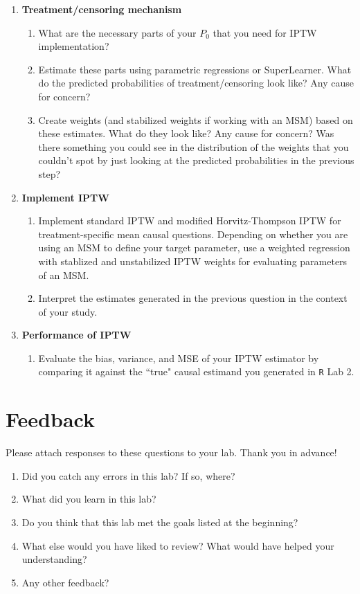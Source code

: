 \documentclass{exam}
\begin{document}
\begin{enumerate}
\item \textbf{Treatment/censoring mechanism}
\begin{enumerate}
\item What are the necessary parts of your $P_0$ that you need for IPTW implementation?
\item Estimate these parts using parametric regressions or SuperLearner. What do the predicted probabilities of treatment/censoring look like? Any cause for concern?
\item Create weights (and stabilized weights if working with an MSM) based on these estimates. What do they look like? Any cause for concern? Was there something you could see in the distribution of the weights that you couldn't spot by just looking at the predicted probabilities in the previous step?
\end{enumerate}
\item \textbf{Implement IPTW}
\begin{enumerate}
\item Implement standard IPTW and modified Horvitz-Thompson IPTW for treatment-specific mean causal questions. Depending on whether you are using an MSM to define your target parameter, use a weighted regression with stablized and unstabilized IPTW weights for evaluating parameters of an MSM.
\item Interpret the estimates generated in the previous question in the context of your study.
\end{enumerate}
\item \textbf{Performance of IPTW}
\begin{enumerate}
\item Evaluate the bias, variance, and MSE of your IPTW estimator by comparing it against the ``true" causal estimand you generated in \texttt{R} Lab 2.
\end{enumerate}
\end{enumerate}

\pagebreak

\section{Feedback}

Please attach responses to these questions to your lab. Thank you in advance!

\begin{enumerate}
\item Did you catch any errors in this lab? If so, where?
\item What did you learn in this lab?
\item Do you think that this lab met the goals listed at the beginning? 
\item What else would you have liked to review? What would have helped your understanding?
\item Any other feedback?
\end{enumerate}
\end{document}
